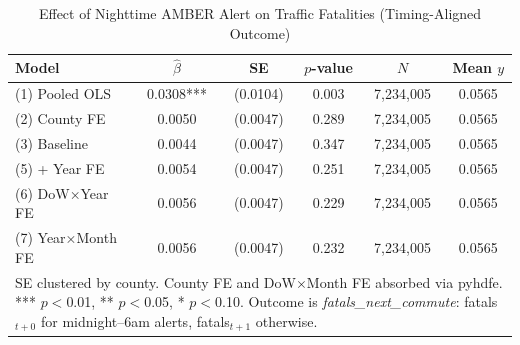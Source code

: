 \begin{table}[htbp]\centering
\caption{Effect of Nighttime AMBER Alert on Traffic Fatalities (Timing-Aligned Outcome)}
\begin{tabular}{lccccc}
\hline\hline
Model & $\hat\beta$ & SE & $p$-value & $N$ & Mean $y$ \\
\midrule
(1) Pooled OLS & 0.0308*** & (0.0104) & 0.003 & 7,234,005 & 0.0565 \\
(2) County FE & 0.0050 & (0.0047) & 0.289 & 7,234,005 & 0.0565 \\
(3) Baseline & 0.0044 & (0.0047) & 0.347 & 7,234,005 & 0.0565 \\
(5) + Year FE & 0.0054 & (0.0047) & 0.251 & 7,234,005 & 0.0565 \\
(6) DoW×Year FE & 0.0056 & (0.0047) & 0.229 & 7,234,005 & 0.0565 \\
(7) Year×Month FE & 0.0056 & (0.0047) & 0.232 & 7,234,005 & 0.0565 \\
\hline\hline
\multicolumn{6}{p{0.9\textwidth}}{\footnotesize SE clustered by county. County FE and DoW$\times$Month FE absorbed via pyhdfe. *** $p{<}$0.01, ** $p{<}$0.05, * $p{<}$0.10. Outcome is \textit{fatals\_next\_commute}: fatals$_{t+0}$ for midnight--6am alerts, fatals$_{t+1}$ otherwise.} \\
\end{tabular}
\end{table}